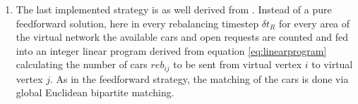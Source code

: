 \begin{enumerate}
\item The last implemented strategy is as well derived from \cite{pavone2011load}. Instead of a pure feedforward solution, here  in every rebalancing timestep $\delta t_R$ for every area of the virtual network the available cars and open requests are counted and fed into an integer linear program derived from equation \ref{eq:linearprogram} calculating the number of cars $reb _{ij}$ to be sent from virtual vertex $i$ to virtual vertex $j$. As in the feedforward strategy, the matching of the cars is done via global Euclidean bipartite matching.
\end{enumerate}
